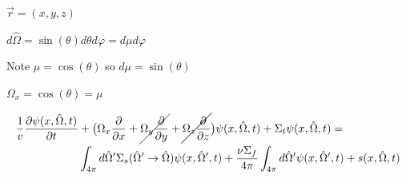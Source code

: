 \documentclass[12pt]{article}
\newcommand{\vOmega}{\ensuremath{\hat{\Omega}}}
\begin{document}
$\vec{r} = (x, y, z)$

$d\vOmega = \sin(\theta) d\theta	d\varphi = d\mu d\varphi$

Note $\mu = \cos(\theta)$ so $d\mu = \sin(\theta)$

$\Omega_x = \cos(\theta) = \mu$

\begin{align*}
\frac{1}{v}\frac{\partial \psi(x, \vOmega, t)}{\partial t} &+ 
\bigl(\Omega_x \frac{\partial}{\partial x} + \cancel{\Omega_y \frac{\partial}{\partial y}} + \cancel{\Omega_z \frac{\partial}{\partial z}} \bigr)\psi(x, \vOmega, t) +
\Sigma_t \psi(x, \vOmega, t) = \nonumber\\
%
& \int_{4\pi} d\vOmega' \Sigma_s(\vOmega' \rightarrow \vOmega) \psi(x, \vOmega', t)  + 
\frac{\nu \Sigma_f}{4\pi} \int_{4\pi} d\vOmega' \psi(x,  \vOmega', t) + s(x, \vOmega, t)%
\end{align*}
\end{document}

